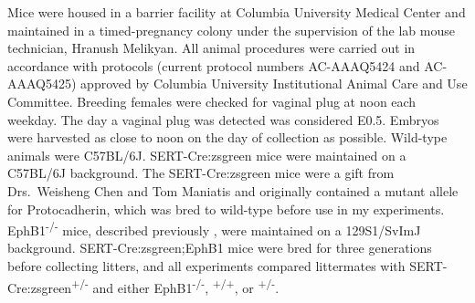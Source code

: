 Mice were housed in a barrier facility at Columbia University Medical Center and maintained in a timed-pregnancy colony under the supervision of the lab mouse technician, Hranush Melikyan.
All animal procedures were carried out in accordance with protocols (current protocol numbers AC-AAAQ5424 and AC-AAAQ5425) approved by Columbia University Institutional Animal Care and Use Committee.
Breeding females were checked for vaginal plug at noon each weekday.
The day a vaginal plug was detected was considered E0.5.
Embryos were harvested as close to noon on the day of collection as possible.
Wild-type animals were C57BL/6J.
SERT-Cre:zsgreen mice were maintained on a C57BL/6J background.
The SERT-Cre:zsgreen mice were a gift from Drs.~Weisheng Chen and Tom Maniatis and originally contained a mutant allele for Protocadherin, which was bred to wild-type before use in my experiments.
EphB1\textsuperscript{-/-} mice, described previously \cite{williams2003ephrin}, were maintained on a 129S1/SvImJ background.
SERT-Cre:zsgreen;EphB1 mice were bred for three generations before collecting litters, and all experiments compared littermates with SERT-Cre:zsgreen\textsuperscript{+/-} and either EphB1\textsuperscript{-/-}, \textsuperscript{+/+}, or \textsuperscript{+/-}.

